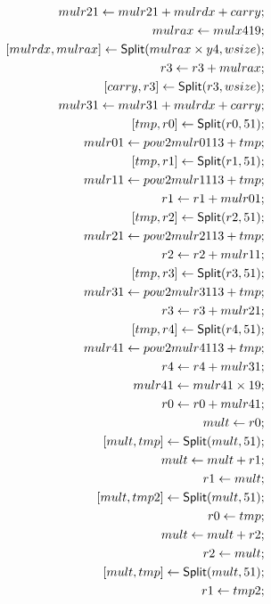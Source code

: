 \begin{align*}
mulr21 \leftarrow mulr21 + mulrdx + carry; \\
mulrax \leftarrow mulx419; \\
\concat{mulrdx}{mulrax} \leftarrow \dslcode{Split}(mulrax \times y4, wsize); \\
r3 \leftarrow r3 + mulrax; \\
\concat{carry}{r3} \leftarrow \dslcode{Split}(r3, wsize); \\
mulr31 \leftarrow mulr31 + mulrdx + carry; \\
\concat{tmp}{r0} \leftarrow \dslcode{Split}(r0, 51); \\
mulr01 \leftarrow pow2 mulr01 13 + tmp; \\
\concat{tmp}{r1} \leftarrow \dslcode{Split}(r1, 51); \\
mulr11 \leftarrow pow2 mulr11 13 + tmp; \\
r1 \leftarrow r1 + mulr01; \\
\concat{tmp}{r2} \leftarrow \dslcode{Split}(r2, 51); \\
mulr21 \leftarrow pow2 mulr21 13 + tmp; \\
r2 \leftarrow r2 + mulr11; \\
\concat{tmp}{r3} \leftarrow \dslcode{Split}(r3, 51); \\
mulr31 \leftarrow pow2 mulr31 13 + tmp; \\
r3 \leftarrow r3 + mulr21; \\
\concat{tmp}{r4} \leftarrow \dslcode{Split}(r4, 51); \\
mulr41 \leftarrow pow2 mulr41 13 + tmp; \\
r4 \leftarrow r4 + mulr31; \\
mulr41 \leftarrow mulr41 \times 19; \\
r0 \leftarrow r0 + mulr41; \\
mult \leftarrow r0; \\
\concat{mult}{tmp} \leftarrow \dslcode{Split}(mult, 51); \\
mult \leftarrow mult + r1; \\
r1 \leftarrow mult; \\
\concat{mult}{tmp2} \leftarrow \dslcode{Split}(mult, 51); \\
r0 \leftarrow tmp; \\
mult \leftarrow mult + r2; \\
r2 \leftarrow mult; \\
\concat{mult}{tmp} \leftarrow \dslcode{Split}(mult, 51); \\
r1 \leftarrow tmp2; \\

\end{align*}
